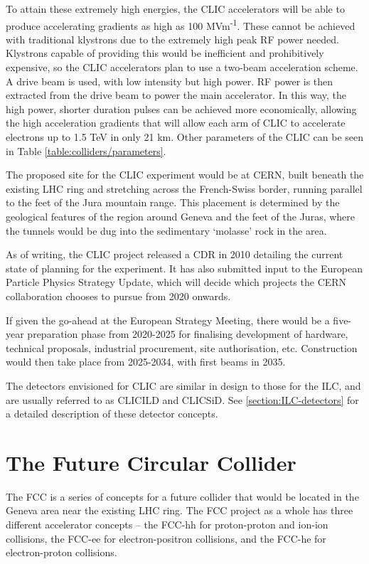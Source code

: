 To attain these extremely high energies, the \acrshort{CLIC} accelerators will be able to produce accelerating gradients as high as 100 MVm\textsuperscript{-1}. These cannot be achieved with traditional klystrons due to the extremely high peak \acrshort{RF} power needed. Klystrons capable of providing this would be inefficient and prohibitively expensive, so the \acrshort{CLIC} accelerators plan to use a two-beam acceleration scheme. A drive beam is used, with low intensity but high power. \acrshort{RF} power is then extracted from the drive beam to power the main accelerator. In this way, the high power, shorter duration pulses can be achieved more economically, allowing the high acceleration gradients that will allow each arm of \acrshort{CLIC} to accelerate electrons up to 1.5 TeV in only 21 km. Other parameters of the \acrshort{CLIC} can be seen in Table \ref{table:colliders/parameters}.

The proposed site for the \acrshort{CLIC} experiment would be at \acrshort{CERN}, built beneath the existing \acrshort{LHC} ring and stretching across the French-Swiss border, running parallel to the feet of the Jura mountain range. This placement is determined by the geological features of the region around Geneva and the feet of the Juras, where the tunnels would be dug into the sedimentary `molasse' rock in the area. 

As of writing, the \acrshort{CLIC} project released a \acrfull{CDR} in 2010 detailing the current state of planning for the experiment. It has also submitted input to the European Particle Physics Strategy Update, which will decide which projects the \acrshort{CERN} collaboration chooses to pursue from 2020 onwards.

If given the go-ahead at the European Strategy Meeting, there would be a five-year preparation phase from 2020-2025 for finalising development of hardware, technical proposals, industrial procurement, site authorisation, etc. Construction would then take place from 2025-2034, with first beams in 2035.

The detectors envisioned for \acrshort{CLIC} are similar in design to those for the \acrshort{ILC}, and are usually referred to as CLIC\textunderscore ILD and CLIC\textunderscore SiD. See \ref{section:ILC-detectors} for a detailed description of these detector concepts.

\section{The Future Circular Collider}
The \acrfull{FCC} is a series of concepts for a future collider that would be located in the Geneva area near the existing LHC ring. The \acrshort{FCC} project as a whole has three different accelerator concepts -- the FCC-hh for proton-proton and ion-ion collisions, the FCC-ee for electron-positron collisions, and the FCC-he for electron-proton collisions.

